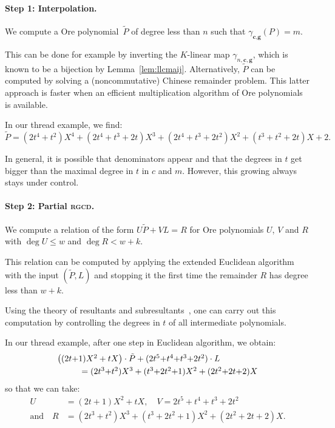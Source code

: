 \documentclass[a4paper]{llncs}
\newcommand{\rgcd}{\textsc{rgcd}}
\newcommand{\bc}{\textbf{c}}
\newcommand{\bg}{\textbf{g}}
\begin{document}
\paragraph{Step 1: Interpolation.}

We compute a Ore polynomial~$\tilde P$ of degree less than $n$
such that $\gamma_{\bc,\bg}(P) = m$.

\noindent
This can be done for example by inverting the $K$-linear map 
$\gamma_{n,\bc,\bg}$, which is known to be a bijection by 
Lemma~\ref{lem:llcmaij}. Alternatively, $\tilde P$ can be
computed by solving a (noncommutative) Chinese remainder
problem. This latter approach is faster when an efficient
multiplication algorithm of Ore polynomials is available.

{\small
\begin{example}
In our thread example, we find:
$$\tilde P =
(2t^4{+}t^2) X^4 + (2t^4{+}t^3{+}2t) X^3 +
(2t^4{+}t^3{+}2t^2)X^2 + (t^3{+}t^2{+}2t) X + 2.$$
\end{example}}

\begin{remark}
In general, it is possible that denominators appear and
that the degrees in $t$ get bigger than the maximal degree
in $t$ in $c$ and $m$. However, this growing always stays
under control.
\end{remark}

\paragraph{Step 2: Partial \rgcd.}

We compute a relation of the form
$U \tilde P + V L = R$
for Ore polynomials $U$, $V$ and $R$ with $\deg U \leq w$ and
$\deg R < w+k$.

\noindent
This relation can be computed by applying the extended Euclidean 
algorithm with the input $(\tilde P, L)$ and stopping it the first
time the remainder $R$ has degree less than $w+k$.

\begin{remark}
Using the theory of resultants and subresultants~\cite{li},
one can carry out this computation by controlling the degrees
in $t$ of all intermediate polynomials.
\end{remark}

{\small
\begin{example}
In our thread example, after one step in Euclidean algorithm,
we obtain:
$$\begin{array}{l}
  \big((2t{+}1)X^2 + tX\big) \cdot \tilde P 
+ (2t^5{+}t^4{+}t^3{+}2t^2) \cdot L \smallskip \\
\hspace{1cm}
= (2t^3{+}t^2) X^3 + (t^3{+}2t^2{+}1) X^2 + (2t^2{+}2t{+}2)X
\end{array}$$
so that we can take:
\begin{align*}
U & = (2t{+}1)X^2 + tX, \quad
V   = 2t^5{+}t^4{+}t^3{+}2t^2 \\
\text{and} \quad
R & = (2t^3{+}t^2) X^3 + (t^3{+}2t^2{+}1) X^2 + (2t^2{+}2t{+}2)X.
\end{align*}
\end{example}}
\end{document}
